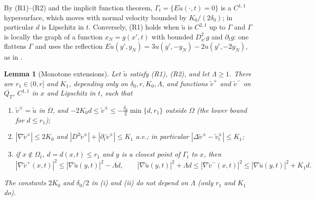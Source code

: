 \documentclass[11pt]{amsart}
\newtheorem{lemma}[theorem]{Lemma}
\theoremstyle{definition}
\theoremstyle{remark}
\begin{document}
By (R1)--(R2) and the implicit function theorem, $\Gamma_t=\{E\tilde u(\cdot,t)=0\}$ is a
$C^{1,1}$ hypersurface, which moves with normal velocity bounded by $K_0/(2\delta_0)$; in
particular $d$ is Lipschitz in $t$. Conversely, (R1) holds when $\tilde u$ is $C^{2,1}$ up to
$\Gamma$ and $\Gamma$ is locally the graph of a function $x_N=g(x',t)$ with bounded
$D^2_{x'}g$ and $\partial_tg$: one flattens $\Gamma$ and uses the reflection
$Eu(y',y_N)=3u(y',-y_N)-2u(y',-2y_N)$, as in \cite[Lemma~6.37]{GilbargTrudinger2001}.

\begin{lemma}[Monotone extensions]\label{q:lem:ext}
Let $\tilde u$ satisfy (R1), (R2), and let $\Lambda\ge1$. There are $r_1\in(0,r]$ and
$K_1$, depending only on $\delta_0,r,K_0,\Lambda$, and functions $\tilde v^+$ and
$\tilde v^-$ on $\overline{Q_T}$, $C^{1,1}$ in $x$ and Lipschitz in $t$, such that
\begin{enumerate}
\item[(i)] $\tilde v^\pm=\tilde u$ in $\overline\Omega$, and
$-2K_0d\le\tilde v^\pm\le-\frac{\delta_0}2\min\{d,r_1\}$ outside $\Omega$ (the lower bound for
$d\le r_1$);
\item[(ii)] $|\nabla\tilde v^\pm|\le2K_0$ and
$|D^2\tilde v^\pm|+|\partial_t\tilde v^\pm|\le K_1$ a.e.; in particular
$|\Delta\tilde v^\pm-\tilde v^\pm_t|\le K_1$;
\item[(iii)] if $x\notin\Omega_t$, $d=d(x,t)\le r_1$ and $y$ is a closest point of
$\Gamma_t$ to $x$, then
\[
|\nabla\tilde v^+(x,t)|^2\le|\nabla\tilde u(y,t)|^2-\Lambda d,\qquad
|\nabla\tilde u(y,t)|^2+\Lambda d\le|\nabla\tilde v^-(x,t)|^2\le|\nabla\tilde u(y,t)|^2+K_1d .
\]
\end{enumerate}
The constants $2K_0$ and $\delta_0/2$ in (i) and (ii) do not depend on $\Lambda$ (only $r_1$ and
$K_1$ do).
\end{lemma}
\end{document}
